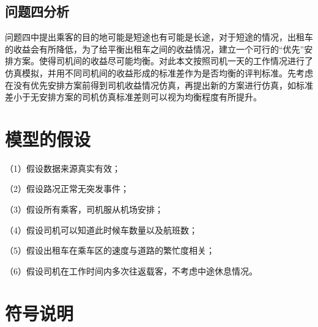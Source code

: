 \documentclass[withoutpreface,bwprint]{cumcmthesis} %
\begin{document}
\subsection{问题四分析}

问题四中提出乘客的目的地可能是短途也有可能是长途，对于短途的情况，出租车的收益会有所降低，为了给平衡出租车之间的收益情况，建立一个可行的“优先”安排方案。使得司机间的收益尽可能均衡。对此本文按照司机一天的工作情况进行了仿真模拟，并用不同司机间的收益形成的标准差作为是否均衡的评判标准。先考虑在没有优先安排方案前得到司机收益情况仿真，再提出新的方案进行仿真，如标准差小于无安排方案的司机仿真标准差则可以视为均衡程度有所提升。


\section{模型的假设}
\begin{flushleft}
（1）假设数据来源真实有效；

（2）假设路况正常无突发事件；

（3）假设所有乘客，司机服从机场安排；

（4）假设司机可以知道此时候车数量以及航班数；

（5）假设出租车在乘车区的速度与道路的繁忙度相关；

（6）假设司机在工作时间内多次往返载客，不考虑中途休息情况。


\end{flushleft}
\newpage
\section{符号说明}
\end{document}
